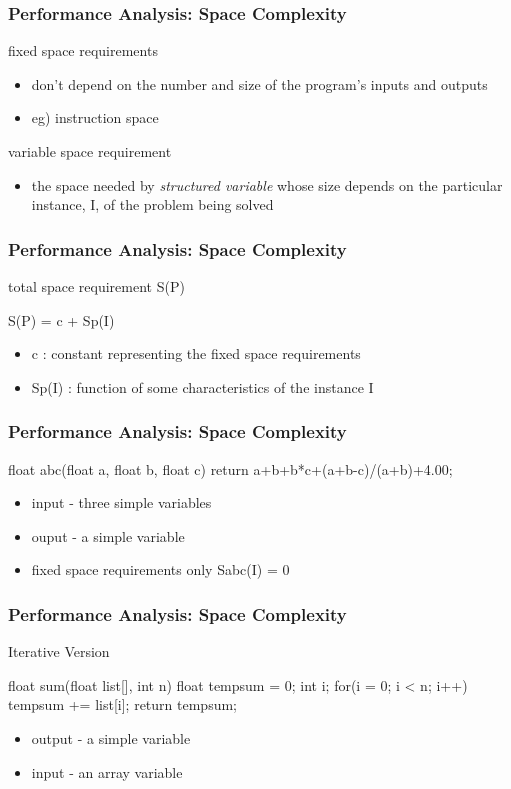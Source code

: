 \documentclass[newPxFont,sthlmFooter,nooffset]{beamer}
\begin{document}
\begin{frame}[t]
  \frametitle{Performance Analysis: Space Complexity}
fixed space requirements
\begin{itemize}
\item don’t depend on the number and size of the program’s inputs and
  outputs
\item eg) instruction space
\end{itemize}

variable space requirement
\begin{itemize}
\item the space needed by \textit{structured variable} whose size depends on
  the particular instance, I, of the problem being solved
\end{itemize}

\end{frame}

\begin{frame}[t, fragile]
  \frametitle{Performance Analysis: Space Complexity}
total space requirement S(P)
\begin{codedef}
  S(P) = c + Sp(I)
\end{codedef}

\begin{itemize}
\item c : constant representing the fixed space requirements 
\item Sp(I) : function of some characteristics of the instance I
\end{itemize}

\end{frame}

\begin{frame}[t, fragile]
  \frametitle{Performance Analysis: Space Complexity}
\begin{codedef}
float abc(float a, float b, float c) { 
   return a+b+b*c+(a+b-c)/(a+b)+4.00;
}    
\end{codedef}
\begin{itemize}
\item input - three simple variables
\item ouput - a simple variable
\item fixed space requirements only Sabc(I) = 0
\end{itemize}

\end{frame}

\begin{frame}[t, fragile]
  \frametitle{Performance Analysis: Space Complexity}
Iterative Version
\begin{codedef}
float sum(float list[], int n) { 
   float tempsum = 0;
   int i;
   for(i = 0; i < n; i++)
      tempsum += list[i];
      return tempsum;
}
\end{codedef}
\begin{itemize}
\item output - a simple variable
\item input - an array variable
\end{itemize}
\end{frame}
\end{document}
